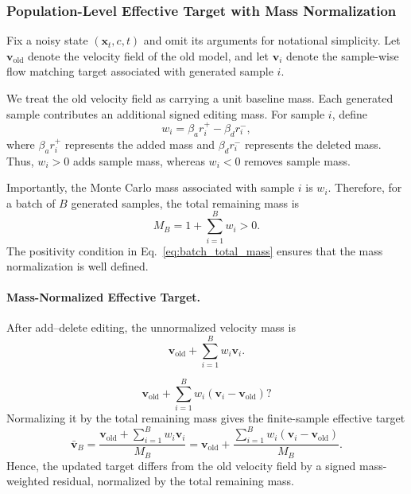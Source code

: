 \subsubsection{Population-Level Effective Target with Mass Normalization}

Fix a noisy state $(\mathbf{x}_t,c,t)$ and omit its arguments for notational
simplicity. Let $\mathbf{v}_{\mathrm{old}}$ denote the velocity field of the
old model, and let $\mathbf{v}_i$ denote the sample-wise flow matching target
associated with generated sample $i$.

We treat the old velocity field as carrying a unit baseline mass. Each generated
sample contributes an additional signed editing mass. For sample $i$, define
\begin{equation}
w_i
=
\beta_a r_i^{+}
-
\beta_d r_i^{-},
\label{eq:net_editing_mass_i}
\end{equation}
where $\beta_a r_i^{+}$ represents the added mass and $\beta_d r_i^{-}$
represents the deleted mass. Thus, $w_i>0$ adds sample mass, whereas $w_i<0$
removes sample mass.

Importantly, the Monte Carlo mass associated with sample $i$ is $w_i$. Therefore, for a batch of $B$ generated samples, the total remaining
mass is
\begin{equation}
M_B
=
1+\sum_{i=1}^{B}w_i
>
0 .
\label{eq:batch_total_mass}
\end{equation}
The positivity condition in Eq.~\eqref{eq:batch_total_mass} ensures that the
mass normalization is well defined.


\paragraph{Mass-Normalized Effective Target.}

After add--delete editing, the unnormalized velocity mass is
\[
\mathbf{v}_{\mathrm{old}}
+
\sum_{i=1}^{B}
w_i\mathbf{v}_i .
\]

\[
\mathbf{v}_{\mathrm{old}}
+
\sum_{i=1}^{B}
w_i(\mathbf{v}_i-\mathbf{v}_{\mathrm{old}})?
\]
Normalizing it by the total remaining mass gives the finite-sample effective
target
\begin{equation}
\boxed{
\bar{\mathbf{v}}_{B}
=
\frac{
\mathbf{v}_{\mathrm{old}}
+
\sum_{i=1}^{B}
w_i\mathbf{v}_i
}{
M_B
}
=
\mathbf{v}_{\mathrm{old}}
+
\frac{
\sum_{i=1}^{B}
w_i
\left(
\mathbf{v}_i-\mathbf{v}_{\mathrm{old}}
\right)
}{
M_B
}.
}
\label{eq:batch_mass_normalized_target}
\end{equation}
Hence, the updated target differs from the old velocity field by a signed
mass-weighted residual, normalized by the total remaining mass.


